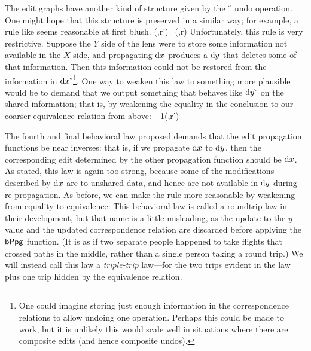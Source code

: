 The edit graphs have another kind of structure given by the $\breve{\ }$
undo operation. One might hope that this structure is preserved in a similar
way; for example, a rule like  seems reasonable at first
blush.
    {\mlfppg(\dx\swoop,r')=(\dy\swoop,r)}
Unfortunately, this rule is very restrictive. Suppose the $Y$ side of the
lens were to store some information not available in the $X$ side, and
propagating $\textrm{d} x$ produces a $\textrm{d} y$ that deletes some of that information.
Then this information could not be restored from the information in
$\textrm{d} x\breve{\ }$\footnote{One could imagine storing just enough information in
the correspondence relations to allow undoing one operation. Perhaps this
could be made to work, but it is unlikely this would scale well in
situations where there are composite edits (and hence composite undos).}.
One way to weaken this law to something more plausible would be to demand
that we output something that behaves like $\textrm{d} y\breve{\ }$ on the shared
information; that is, by weakening the equality in the conclusion to our
coarser equivalence relation from above:
    {\mlfppg_1(\dx\swoop,r')  \dy\swoop}

The fourth and final behavioral law proposed demands that the edit
propagation functions be near inverses: that is, if we propagate $\textrm{d} x$ to
$\textrm{d} y$, then the corresponding edit determined by the other propagation
function should be $\textrm{d} x$. As stated, this law is again too strong, because
some of the modifications described by $\textrm{d} x$ are to unshared data, and hence
are not available in $\textrm{d} y$ during re-propagation. As before, we can make the
rule more reasonable by weakening from equality to equivalence:
This behavioral law is called a roundtrip law in their development, but that
name is a little misleading, as the update to the $y$ value and the updated
correspondence relation are discarded before applying the $\mathsf{bPpg}$
function. (It is as if two separate people happened to take flights that
crossed paths in the middle, rather than a single person taking a round
trip.) We will instead call this law a \emph{triple-trip} law---for the two
trips evident in the law plus one trip hidden by the equivalence relation.


